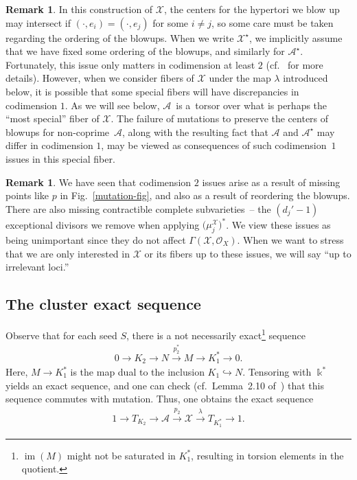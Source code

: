 \documentclass[10pt,a4paper]{amsart}
\numberwithin{equation}{section}
\numberwithin{figure}{section}
\numberwithin{table}{section}
\DeclareMathOperator{\im}{im}
\let\rar=\rightarrow
\let\s=\mathcal
\newcommand {\kk} {\Bbbk}
\theoremstyle{definition}
\newtheorem{rmk}[thm]{Remark}
\begin{document}
\begin{rmk}\label{CodimensionOne}In this construction of $\s{X}$, the centers for the hypertori we blow up may intersect if $(\cdot,e_i)=(\cdot,e_j)$ for some $i\neq j$, so some care must be taken regarding the ordering of the blowups. When we write $\s{X}^{\star}$, we implicitly assume that we have fixed some ordering of the blowups, and similarly for $\s{A}^{\star}$. Fortunately, this issue only matters in codimension at least $2$ (cf.~\cite{GHK3} for more details). However, when we consider fibers of $\s{X}$ under the map $\lambda$ introduced below, it is possible that some special fibers will have discrepancies in codimension $1$. As we will see below, $\s{A}$~is a~torsor over what is perhaps the ``most special'' fiber of $\s{X}$. The failure of mutations to preserve the centers of blowups for non-coprime~$\s{A}$, along with the resulting fact that $\s{A}$ and $\s{A}^{\star}$ may differ in codimension $1$, may be viewed as consequences of such codimension~$1$ issues in this special fiber.
\end{rmk}

\begin{rmk}\label{affinization}We have seen that codimension $2$ issues arise as a result of missing points like $p$ in Fig.~\ref{mutation-fig}, and also as a result of reordering the blowups. There are also missing contractible complete subvarieties~-- the $(d_j'-1)$ exceptional divisors we remove when applying $\big(\mu_j^{\s{X}}\big)^*$. We view these issues as being unimportant since they do not affect $\Gamma(\s{X},\s{O}_X)$. When we want to stress that we are only interested in $\s{X}$ or its fibers up to these issues, we will say ``up to irrelevant loci.''
\end{rmk}

\subsection{The cluster exact sequence}\label{cluster exact section}
Observe that for each seed $S$, there is a not necessarily exact\footnote{$\im(M)$ might not be saturated in $K_1^*$, resulting in torsion elements in the quotient.} sequence
\begin{gather*}
	0 \rar K_2 \rar N \stackrel{p_2^*}{\rar} M \rar K_1^* \rar 0.
\end{gather*}
Here, $M\rar K_1^*$ is the map dual to the inclusion $K_1\hookrightarrow N$. Tensoring with $\kk^*$ yields an exact sequence, and one can check (cf.\ Lemma~2.10 of~\cite{FG1}) that this sequence commutes with mutation. Thus, one obtains the exact sequence
\begin{gather*}
	1\rar T_{K_2} \rar \s{A} \stackrel{p_2}{\rar} \s{X} \stackrel{\lambda}{\rar} T_{K_1^*} \rar 1.
\end{gather*}
\end{document}

